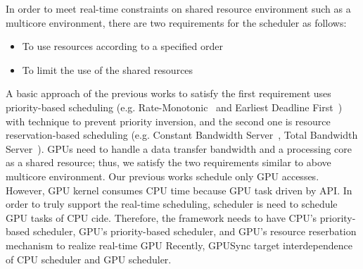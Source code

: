 In order to meet real-time constraints on shared resource environment such as a multicore environment,
there are two requirements for the scheduler as follows:
\begin{itemize}
\item To use resources according to a specified order
\item To limit the use of the shared resources
\end{itemize}
A basic approach of the previous works to satisfy the first requirement uses priority-based scheduling (e.g. Rate-Monotonic~\cite{sched:rm} and Earliest Deadline First~\cite{sched:edf}) with technique to prevent priority inversion,
and the second one is resource reservation-based scheduling (e.g. Constant Bandwidth Server~\cite{rr:cbs}, Total Bandwidth Server~\cite{rr:tbs2}).
GPUs need to handle a data transfer bandwidth and a processing core as a shared resource;
thus, we satisfy the two requirements similar to above multicore environment.
Our previous works schedule only GPU accesses. 
However, GPU kernel consumes CPU time because GPU task driven by API.
In order to truly support the real-time scheduling, scheduler is need to schedule GPU tasks of CPU cide.
Therefore, the framework needs to have CPU's priority-based scheduler, GPU's priority-based scheduler, and GPU's resource reserbation mechanism to realize real-time GPU
Recently, GPUSync target interdependence of CPU scheduler and GPU scheduler.

